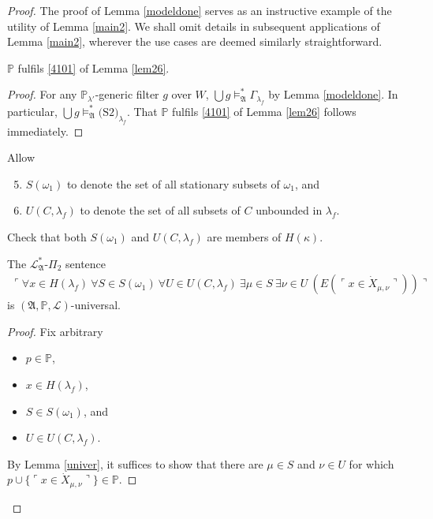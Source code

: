 \documentclass[12pt]{article}
\numberwithin{equation}{section}
\begin{document}
\begin{proof}
The proof of Lemma \ref{modeldone} serves as an instructive example of the utility of Lemma \ref{main2}. We shall omit details in subsequent applications of Lemma \ref{main2}, wherever the use cases are deemed similarly straightforward. 

\begin{lem}\label{1done}
$\mathbb{P}$ fulfils \ref{4101} of Lemma \ref{lem26}.
\end{lem}

\begin{proof}
For any $\mathbb{P}_{\lambda'}$-generic filter $g$ over $W$, $\bigcup g \models^*_{\mathfrak{A}} \Gamma_{\lambda_f}$ by Lemma \ref{modeldone}. In particular, $\bigcup g \models^*_{\mathfrak{A}} \text{(S2)}_{\lambda_f}$. That $\mathbb{P}$ fulfils \ref{4101} of Lemma \ref{lem26} follows immediately.
\end{proof}

Allow
\begin{enumerate}[label=(\Alph*)]
    \setcounter{enumi}{4}
    \item $S(\omega_1)$ to denote the set of all stationary subsets of $\omega_1$, and
    \item\label{def423} $U(C, \lambda_f)$ to denote the set of all subsets of $C$ unbounded in $\lambda_f$.
\end{enumerate}
Check that both $S(\omega_1)$ and $U(C, \lambda_f)$ are members of $H(\kappa)$.

\begin{lem}\label{sideuni}
The $\mathcal{L}^*_{\mathfrak{A}}$-$\Pi_2$ sentence 
\begin{align}\label{c9}
    \ulcorner \forall x \in H(\lambda_f) \ \forall S \in S(\omega_1) \ \forall U \in U(C, \lambda_f) \ \exists \mu \in S \ \exists \nu \in U \ (E(\ulcorner x \in \dot{X}_{\mu, \nu} \urcorner)) \urcorner
\end{align} 
is $(\mathfrak{A}, \mathbb{P}, \mathcal{L})$-universal.
\end{lem}

\begin{proof}
Fix arbitrary
\begin{itemize}
    \item $p \in \mathbb{P}$,
    \item $x \in H(\lambda_f)$,
    \item $S \in S(\omega_1)$, and
    \item $U \in U(C, \lambda_f)$.
\end{itemize}
By Lemma \ref{univer}, it suffices to show that there are $\mu \in S$ and $\nu \in U$ for which $p \cup \{\ulcorner x \in \dot{X}_{\mu, \nu} \urcorner\} \in \mathbb{P}$.


\end{proof}
\end{proof}
\end{document}
